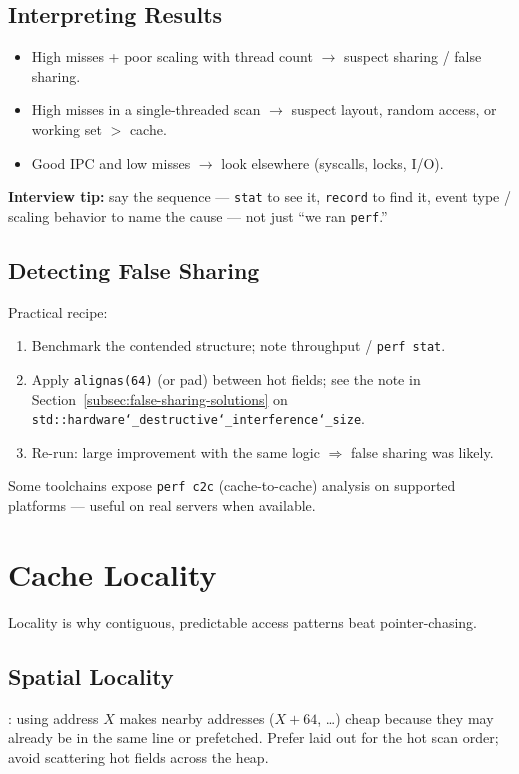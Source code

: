 \subsection{Interpreting Results}
\label{subsec:profiling-interpretation}
\begin{itemize}
    \item High misses + poor scaling with thread count $\rightarrow$ suspect sharing / false sharing.
    \item High misses in a single-threaded scan $\rightarrow$ suspect layout, random access, or working set $>$ cache.
    \item Good IPC and low misses $\rightarrow$ look elsewhere (syscalls, locks, I/O).
\end{itemize}
\par\noindent\textbf{Interview tip:} say the sequence --- \texttt{stat} to see it, \texttt{record} to find it, 
event type / scaling behavior to name the cause --- not just ``we ran \texttt{perf}.''

\subsection{Detecting False Sharing}
\label{subsec:profiling-false-sharing}
Practical recipe:
\begin{enumerate}
    \item Benchmark the contended structure; note throughput / \texttt{perf stat}.
    \item Apply \texttt{alignas(64)} (or pad) between hot fields; see the note in 
          Section~\ref{subsec:false-sharing-solutions} on 
          \texttt{std::hardware\char`_destructive\char`_interference\char`_size}.
    \item Re-run: large improvement with the same logic $\Rightarrow$ false sharing was likely.
\end{enumerate}
Some toolchains expose \texttt{perf c2c} (cache-to-cache) analysis on supported platforms --- 
useful on real servers when available.

\section{Cache Locality}
\label{sec:cache-locality}
Locality is why contiguous, predictable access patterns beat pointer-chasing.

\subsection{Spatial Locality}
\label{subsec:spatial-locality}
: using address $X$ makes nearby addresses ($X+64$, \ldots) cheap 
because they may already be in the same line or prefetched. 
Prefer  laid out for the hot scan order; avoid scattering 
hot fields across the heap.

